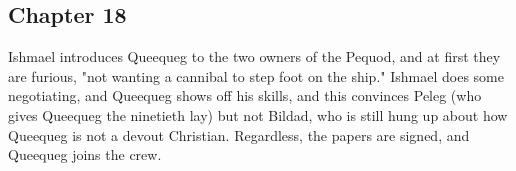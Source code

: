 \subsection{Chapter 18}

Ishmael introduces Queequeg to the two owners of the Pequod, and at first they
are furious, "not wanting a cannibal to step foot on the ship." Ishmael does
some negotiating, and Queequeg shows off his skills, and this convinces Peleg
(who gives Queequeg the ninetieth lay) but not Bildad, who is still hung up
about how Queequeg is not a devout Christian. Regardless, the papers are
signed, and Queequeg joins the crew.
